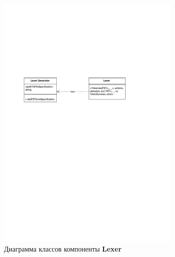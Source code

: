 \begin{figure}[h!]
\begin{center}
\includegraphics[width=0.8\textwidth]{Polubelova/ClassDiagramLexer}
\caption{Диаграмма классов компоненты \textbf{Lexer}}
\label{fig:ClassLexer} 
\end{center}
\end{figure}

